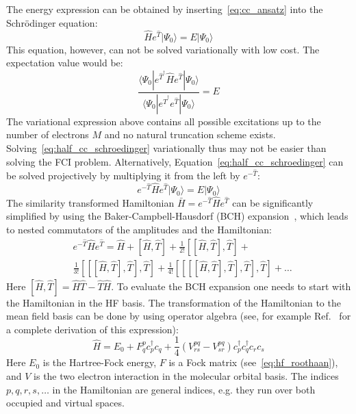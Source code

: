 The energy expression can be obtained by inserting~\ref{eq:cc_ansatz} into the 
Schr{\"o}dinger equation:
%
\begin{equation}
 \hat{H} e^{\hat{T}} | \Psi_{0} \rangle  = E |\Psi_{0} \rangle
 \label{eq:half_cc_schroedinger}
\end{equation}
%
This equation, however, can not be solved variationally with low 
cost. The expectation value would be:
%
\begin{equation}
 \frac{\langle \Psi_{0} | e^{\hat{T}^{\dagger}} \hat{H} e^{\hat{T}} | \Psi_{0} 
\rangle}{\langle \Psi_{0} | e^{\hat{T}^{\dagger}} e^{\hat{T}} |\Psi_{0} 
\rangle} = E 
\end{equation}
%
The variational expression above contains all possible excitations up to the 
number of electrons $M$ and no natural truncation scheme exists. 
Solving~\ref{eq:half_cc_schroedinger} variationally thus may not be easier 
than solving the FCI problem. Alternatively, 
Equation~\ref{eq:half_cc_schroedinger} can be solved projectively by 
multiplying it from the left by $e^{-\hat{T}}$:
%
\begin{equation}
 e^{-\hat{T}} \hat{H} e^{\hat{T}} |\Psi_{0} \rangle = E | \Psi_{0} \rangle
\end{equation}
%
The similarity transformed Hamiltonian $\bar{H} = e^{-\hat{T}} \hat{H} 
e^{\hat{T}}$ can be significantly simplified by using 
the Baker-Campbell-Hausdorf (BCH) expansion~\cite{crawford2000introduction, 
shavitt2009many}, which leads 
to nested commutators of the amplitudes and the Hamiltonian:
%
\begin{equation}
\begin{aligned}
  &e^{-\hat{T}} \hat{H} e^{\hat{T}} = \hat{H} + \left[ \hat{H}, \hat{T} \right] 
+ \frac{1}{2!} \left[ \left[ \hat{H}, \hat{T} \right], \hat{T} \right] +\\
&\frac{1}{3!} \left[ \left[ \left[  \hat{H}, \hat{T} \right], \hat{T} \right], 
\hat{T} \right] + \frac{1}{4!} \left[ \left[ \left[ \left[ \hat{H}, \hat{T} 
\right], \hat{T} \right], \hat{T} \right], \hat{T} \right] + \ldots
\end{aligned}
\label{eq:bch_expansion}
\end{equation}
%
Here $\left[ \hat{H}, \hat{T} \right] = \hat{H} \hat{T} - \hat{T}\hat{H}$.
To evaluate the BCH expansion one needs to start with the Hamiltonian in the 
HF basis. The transformation of the Hamiltonian to the mean field basis can 
be done by using operator algebra (see, for example 
Ref.~\cite{crawford2000introduction} for a complete derivation of this 
expression):
%
\begin{equation}
 \hat{H} = E_{0} + F_{q}^{p} c^{\dagger}_{p} c_{q} + \frac{1}{4} (V_{rs}^{pq} 
- V_{sr}^{pq}) c^{\dagger}_{p} c^{\dagger}_{q} c_{r} c_{s}
\end{equation}
%
Here $E_{0}$ is the Hartree-Fock energy, $F$ is a Fock matrix 
(see~\ref{eq:hf_roothaan}), and $V$ is the two electron interaction in the 
molecular orbital basis. The indices $p,q,r,s,\ldots$ in the Hamiltonian are 
general indices, e.g. they run over both occupied and virtual spaces.

